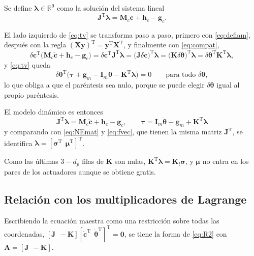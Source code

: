 \documentclass[11pt]{article}
\newcommand{\T}{^{\mathrm{T}}}
\newcommand{\lam}{\boldsymbol{\lambda}}
\newcommand{\muv}{\boldsymbol{\mu}}
\newcommand{\sig}{\boldsymbol{\sigma}}
\newcommand{\cd}{\dot{\mathbf{c}}}
\newcommand{\cdd}{\ddot{\mathbf{c}}}
\newcommand{\thv}{\boldsymbol{\theta}}
\newcommand{\tauv}{\boldsymbol{\tau}}
\begin{document}
Se define $\lam\in\mathbb{R}^9$ como la solución del sistema lineal
\begin{equation}
\mathbf{J}\T\lam=\mathbf{M}_c\cdd+\mathbf{h}_c-\mathbf{g}_c .
\label{eq:deflam}
\end{equation}

El lado izquierdo de \eqref{eq:tv} se transforma paso a paso, primero con \eqref{eq:deflam}, después con la regla $(\mathbf{X}\mathbf{y})\T=\mathbf{y}\T\mathbf{X}\T$, y finalmente con \eqref{eq:compat},
\begin{equation}
\delta\mathbf{c}\T\big(\mathbf{M}_c\cdd+\mathbf{h}_c-\mathbf{g}_c\big)
=\delta\mathbf{c}\T\mathbf{J}\T\lam
=\big(\mathbf{J}\delta\mathbf{c}\big)\T\lam
=\big(\mathbf{K}\delta\thv\big)\T\lam
=\delta\thv\T\mathbf{K}\T\lam ,
\label{eq:paso}
\end{equation}
y \eqref{eq:tv} queda
\begin{equation}
\delta\thv\T\big(\tauv+\mathbf{g}_m-\mathbf{I}_m\ddot{\thv}-\mathbf{K}\T\lam\big)=0
\qquad\text{para todo }\delta\thv,
\label{eq:paso2}
\end{equation}
lo que obliga a que el paréntesis sea nulo, porque se puede elegir $\delta\thv$ igual al propio paréntesis.

El modelo dinámico es entonces
\begin{equation}
\boxed{\ \mathbf{J}\T\lam=\mathbf{M}_c\cdd+\mathbf{h}_c-\mathbf{g}_c,
\qquad
\tauv=\mathbf{I}_m\ddot{\thv}-\mathbf{g}_m+\mathbf{K}\T\lam\ }
\label{eq:aumentada}
\end{equation}
y comparando con \eqref{eq:NEmat} y \eqref{eq:fvec}, que tienen la misma matriz $\mathbf{J}\T$, se identifica $\lam=[\sig\T\ \ \muv\T]\T$.

Como las últimas $3-d_p$ filas de $\mathbf{K}$ son nulas, $\mathbf{K}\T\lam=\mathbf{K}_l\sig$, y $\muv$ no entra en los pares de los actuadores aunque se obtiene gratis.

\subsection{Relación con los multiplicadores de Lagrange}

Escribiendo la ecuación maestra como una restricción sobre todas las coordenadas, $[\mathbf{J}\ \ -\mathbf{K}][\cd\T\ \ \dot{\thv}\T]\T=\mathbf{0}$, se tiene la forma de \eqref{eq:R2} con $\mathbf{A}=[\mathbf{J}\ \ -\mathbf{K}]$.
\end{document}
